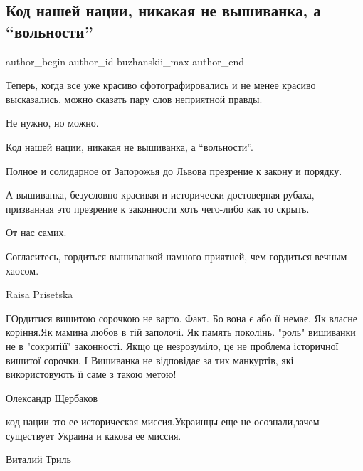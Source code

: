  
 
 
 
 
 
\subsection{Код нашей нации, никакая не вышиванка, а \enquote{вольности}}
\label{sec:21_05_2021.fb.buzhanskii_max.1.volnosti_nacia}
\ifcmt
 author_begin
   author_id buzhanskii_max
 author_end
\fi

Теперь, когда все уже красиво сфотографировались и не менее красиво высказались, можно сказать пару слов неприятной правды.

Не нужно, но можно.

Код нашей нации, никакая не вышиванка, а \enquote{вольности}.

Полное и солидарное от Запорожья до Львова презрение к закону и порядку.

А вышиванка, безусловно красивая и исторически достоверная рубаха, призванная это презрение к законности хоть чего-либо как то скрыть.

От нас самих.

Согласитесь, гордиться вышиванкой намного приятней, чем гордиться вечным
хаосом.

Raisa Prisetska

ГОрдитися вишитою сорочкою не варто. Факт. Бо вона є або її немає. Як власне
коріння.Як мамина любов в тій заполочі. Як память поколінь. "роль" вишиванки не
в "сокритіїї" законності. Якщо це незрозуміло, це не проблема історичної
вишитої сорочки. І Вишиванка не відповідає за тих манкуртів, які використовують
її саме з такою метою!

Олександр Щербаков

код нации-это ее историческая миссия.Украинцы еще не осознали,зачем существует
Украина и какова ее миссия.

Виталий Триль

